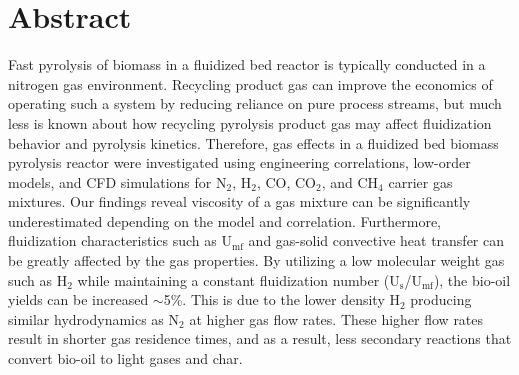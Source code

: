
\section*{Abstract}

Fast pyrolysis of biomass in a fluidized bed reactor is typically conducted in a nitrogen gas environment. Recycling product gas can improve the economics of operating such a system by reducing reliance on pure process streams, but much less is known about how recycling pyrolysis product gas may affect fluidization behavior and pyrolysis kinetics. Therefore, gas effects in a fluidized bed biomass pyrolysis reactor were investigated using engineering correlations, low-order models, and CFD simulations for N$_2$, H$_2$, CO, CO$_2$, and CH$_4$ carrier gas mixtures. Our findings reveal viscosity of a gas mixture can be significantly underestimated depending on the model and correlation. Furthermore, fluidization characteristics such as U$_\textrm{mf}$ and gas-solid convective heat transfer can be greatly affected by the gas properties. By utilizing a low molecular weight gas such as H$_2$ while maintaining a constant fluidization number (U$_\text{s}$/U$_\text{mf}$), the bio-oil yields can be increased $\sim$5\%. This is due to the lower density H$_2$ producing similar hydrodynamics as N$_2$ at higher gas flow rates. These higher flow rates result in shorter gas residence times, and as a result, less secondary reactions that convert bio-oil to light gases and char.
